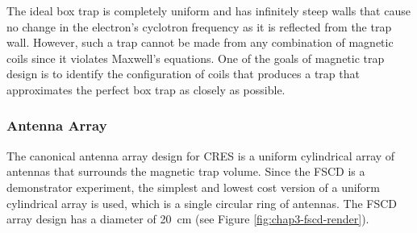 The ideal box trap is completely uniform and has infinitely steep walls that cause no change in the electron's cyclotron frequency as it is reflected from the trap wall. However, such a trap cannot be made from any combination of magnetic coils since it violates Maxwell's equations. One of the goals of magnetic trap design is to identify the configuration of coils that produces a trap that approximates the perfect box trap as closely as possible.

\subsubsection*{Antenna Array}

The canonical antenna array design for CRES is a uniform cylindrical array of antennas that surrounds the magnetic trap volume. Since the FSCD is a demonstrator experiment, the simplest and lowest cost version of a uniform cylindrical array is used, which is a single circular ring of antennas. The FSCD array design has a diameter of 20~cm (see Figure \ref{fig:chap3-fscd-render}).
